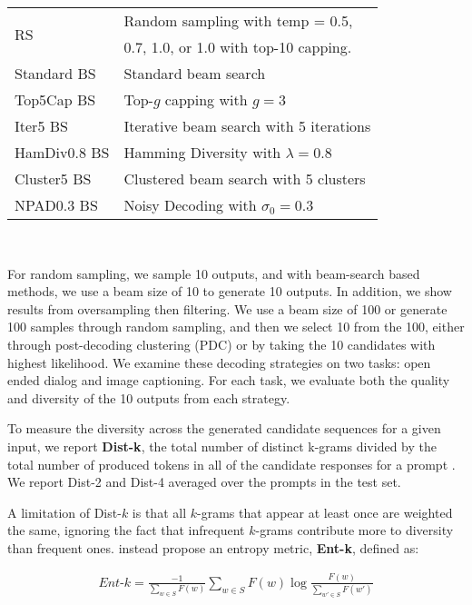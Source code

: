 \documentclass[thesis.tex]{subfiles}
\begin{document}
\begin{center}
\begin{tabular}{l|l}
    \multirow{2}{*}{RS} & Random sampling with temp = 0.5,\\
    & 0.7, 1.0, or 1.0 with top-10 capping.\\
    Standard BS & Standard beam search\\
    Top5Cap BS & Top-$g$ capping with $g=3$\\
    Iter5 BS & Iterative beam search with 5 iterations\\
    HamDiv0.8 BS & Hamming Diversity with $\lambda=0.8$\\
    Cluster5 BS & Clustered beam search with 5 clusters\\
    NPAD0.3 BS & Noisy Decoding with $\sigma_0=0.3$ \\
\end{tabular}\\
\end{center}

For random sampling, we sample 10 outputs, and with beam-search based methods, we use a beam size of 10 to generate 10 outputs. In addition, we show results from oversampling then filtering. We use a beam size of 100 or generate 100 samples through random sampling, and then we select 10 from the 100, either through post-decoding clustering (PDC) or by taking the 10 candidates with highest likelihood. We examine these decoding strategies on two tasks: open ended dialog and image captioning. For each task, we evaluate both the quality and diversity of the 10 outputs from each strategy.

To measure the diversity across the generated candidate sequences for a given input, we report \textbf{Dist-k}, the total number of distinct k-grams divided by the total number of produced tokens in all of the candidate responses for a prompt \citep{li2016diversity}. We report Dist-2 and Dist-4 averaged over the prompts in the test set.

A limitation of Dist-$k$ is that all $k$-grams that appear at least once are weighted the same, ignoring the fact that infrequent $k$-grams contribute more to diversity than frequent ones. 
\cite{zhang2018generating} instead propose an entropy metric, \textbf{Ent-k}, defined as:

 \begin{align}
 \textit{Ent-k} = \frac{-1} {\sum_{w \in S}F(w)} \sum_{w \in S} F(w) \log \frac{F(w)} {\sum_{w' \in S} F(w')}
 \end{align}
 
\end{document}
